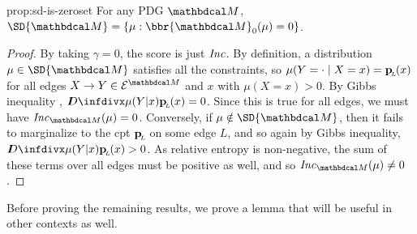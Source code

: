 \begin{old}{prop:sd-is-zeroset}
	For any PDG $\dg M$, $\SD{\dg M} = \{ \mu : \bbr{\dg
M}_0(\mu) = 0\}$. 
\end{old}
\begin{proof}
	 By taking $\gamma = 0$, the score is just $\mathit{Inc}$. By
			 definition, a distribution $\mu \in \SD{\dg M}$ satisfies
	  all the
			 constraints, so $\mu(Y = \cdot \mid X=x) =
			 \mathbf{p}_{\!_{L}\!}(x)$ for all edges $X \rightarrow Y \in \Ed^{\dg
			   M}$ and $x$ with 
			 $\mu(X=x)>0$. By Gibbs inequality
			 \cite{mackay2003information}, 
			 $\kldiv{\mu(Y|x)}{\bp(x)} = 0$. Since this is true
			 for all edges, we must have $\Inc_{\dg M}( \mu) =
			 0$. Conversely, if $\mu \notin \SD{\dg M}$, then it
			 fails to marginalize to the cpt $\mathbf{p}_{\!_{L}\!}$ on some edge
							  $L$, and so again by Gibbs inequality,
			 $\kldiv{\mu(Y|x)}{\bp(x)} > 0$. As relative entropy
			 is non-negative, the sum of these terms over all
			 edges must be positive as well, and so $\Inc_{\dg M}(
			 \mu) \neq 0$. %
\end{proof}


Before proving the remaining results, we prove a lemma that will be useful
in other contexts as well. 

